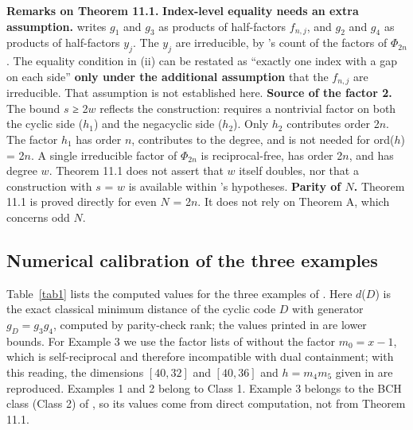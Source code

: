 \documentclass[pdflatex,sn-mathphys-num]{sn-jnl}
\theoremstyle{thmstyleone}
\theoremstyle{thmstylethree}
\begin{document}
\textbf{Remarks on Theorem 11.1.} \textbf{Index-level equality needs an extra assumption.} \cite{LZ22} writes \(g_1\) and \(g_3\) as products of half-factors \(f_{n,j}\), and \(g_2\) and \(g_4\) as products of half-factors \(y_j\). The \(y_j\) are irreducible, by \cite{LZ22}'s count of the factors of \(Φ_{2n}\). The equality condition in (ii) can be restated as ``exactly one index with a gap on each side'' \textbf{only under the additional assumption} that the \(f_{n,j}\) are irreducible. That assumption is not established here. \textbf{Source of the factor 2.} The bound \(s\) ≥ 2\(w\) reflects the construction: \cite{LZ22} requires a nontrivial factor on both the cyclic side (\(h_1\)) and the negacyclic side (\(h_2\)). Only \(h_2\) contributes order 2\(n\). The factor \(h_1\) has order \(n\), contributes to the degree, and is not needed for ord(\(h\)) = 2\(n\). A single irreducible factor of \(Φ_{2n}\) is reciprocal-free, has order 2\(n\), and has degree \(w\). Theorem 11.1 does not assert that \(w\) itself doubles, nor that a construction with \(s\) = \(w\) is available within \cite{LZ22}'s hypotheses.
\textbf{Parity of \(N\).} Theorem 11.1 is proved directly for even \(N\) = 2\(n\). It does not rely on Theorem A, which concerns odd \(N\).

\subsection{Numerical calibration of the three examples}

Table~\ref{tab1} lists the computed values for the three examples of \cite{LZ22}. Here \(d\)(\(D\)) is the exact classical minimum distance of the cyclic code \(D\) with generator \(g_D=g_3g_4\), computed by parity-check rank; the values printed in \cite{LZ22} are lower bounds. For Example 3 we use the factor lists of \cite{LZ22} without the factor \(m_0=x-1\), which is self-reciprocal and therefore incompatible with dual containment; with this reading, the dimensions \([40,32]\) and \([40,36]\) and \(h=m_4m_5\) given in \cite{LZ22} are reproduced. Examples 1 and 2 belong to Class 1. Example 3 belongs to the BCH class (Class 2) of \cite{LZ22}, so its values come from direct computation, not from Theorem 11.1.
\end{document}
